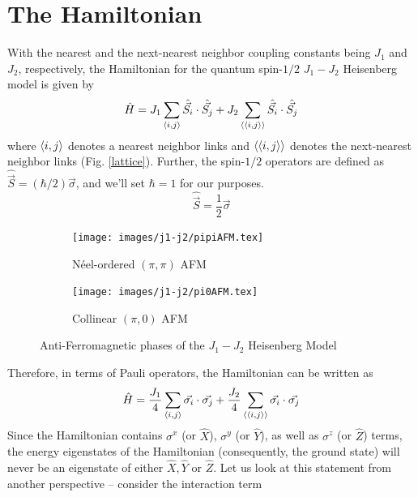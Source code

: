 \documentclass[../journal_main.tex]{subfiles}
\begin{document}
\section{The Hamiltonian}
With the nearest and the next-nearest neighbor coupling constants being $J_1$ and $J_2$, respectively, the Hamiltonian for the quantum spin-$1/2$ $J_1 - J_2$ Heisenberg model is given by
\begin{equation}
    \hat{H} = J_1 \sum_{\expval{i, j}} \hat{\vec{S_i}} \cdot \hat{\vec{S_j}} + J_2 \sum_{\expval{\expval{i, j}}} \hat{\vec{S_i}} \cdot \hat{\vec{S_j}}
\end{equation} 
where $\expval{i, j}$ denotes a nearest neighbor links and $\expval{\expval{i,j}}$ denotes the next-nearest neighbor links (Fig. \ref{lattice}). Further, the spin-$1/2$ operators are defined as $\hat{\vec{S}} = (\hbar/2) \vec{\sigma}$, and we'll set $\hbar = 1$ for our purposes.\begin{equation}
    \hat{\vec{S}} = \frac{1}{2} \vec{\sigma}
\end{equation}
\begin{figure}[t!]
    \centering
    \begin{subfigure}[b]{0.3\textwidth}  %
        \centering
        \texttt{[image: images/j1-j2/pipiAFM.tex]}
        \caption{Néel-ordered $(\pi, \pi)$ AFM}
    \end{subfigure}
    \hspace{3em}  %
    \begin{subfigure}[b]{0.3\textwidth}
        \centering
        \texttt{[image: images/j1-j2/pi0AFM.tex]}
        \caption{Collinear $(\pi, 0)$ AFM}
    \end{subfigure}
    \caption{Anti-Ferromagnetic phases of the $J_1 - J_2$ Heisenberg Model}
    \label{AFM}
\end{figure}
Therefore, in terms of Pauli operators, the Hamiltonian can be written as 
\begin{equation}
    \hat{H} = \frac{J_1}{4} \sum_{\expval{i,j}} \vec{\sigma_i} \cdot \vec{\sigma_j} + \frac{J_2}{4} \sum_{\expval{\expval{i, j}}} \vec{\sigma_i} \cdot \vec{\sigma_j}
\end{equation}
Since the Hamiltonian contains $\sigma^x$ (or $\hat{X}$), $\sigma^y$ (or $\hat{Y}$), as well as $\sigma^z$ (or $\hat{Z}$) terms, the energy eigenstates of the Hamiltonian (consequently, the ground state) will never be an eigenstate of either $\hat{X}, \hat{Y}$ or $\hat{Z}$. Let us look at this statement from another perspective -- consider the interaction term 
\end{document}

